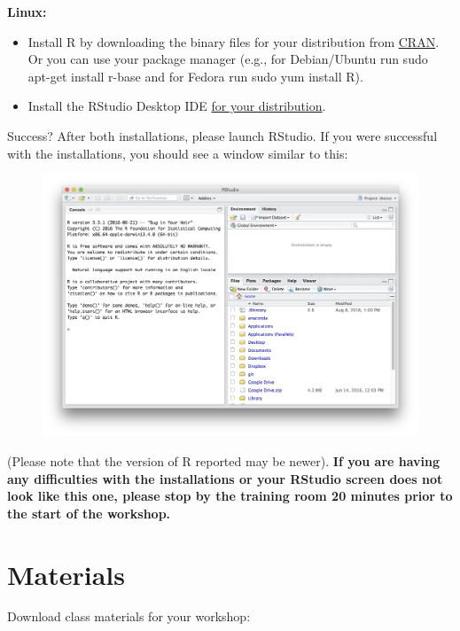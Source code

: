 \documentclass[]{book}
\providecommand{\tightlist}{%
  \setlength{\itemsep}{0pt}\setlength{\parskip}{0pt}}
\begin{document}
\textbf{Linux:}

\begin{itemize}
\tightlist
\item
  Install R by downloading the binary files for your distribution from
  \href{http://cran.r-project.org/index.html}{CRAN}. Or you can use your
  package manager (e.g., for Debian/Ubuntu run sudo apt-get install
  r-base and for Fedora run sudo yum install R).
\item
  Install the RStudio Desktop IDE
  \href{https://rstudio.com/products/rstudio/download/\#download}{for
  your distribution}.
\end{itemize}

Success? After both installations, please launch RStudio. If you were
successful with the installations, you should see a window similar to
this:

\begin{figure}
\centering
\includegraphics{R/Rinstall/images/rstudio_successful_install.png}
\caption{}
\end{figure}

(Please note that the version of R reported may be newer). \textbf{If
you are having any difficulties with the installations or your RStudio
screen does not look like this one, please stop by the training room 20
minutes prior to the start of the workshop.}

\section{Materials}\label{materials}

Download class materials for your workshop:
\end{document}
